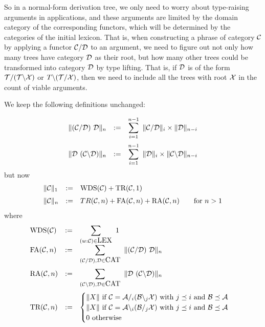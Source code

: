 \documentclass[10pt]{article}
\begin{document}
So in a normal-form derivation tree, we only need to worry about type-raising arguments in applications, and these arguments are limited by the domain category of the corresponding functors, which will be determined by the categories of the initial lexicon.  That is, when constructing a phrase of category ${\cal C}$ by applying a functor ${\cal C}/{\cal D}$ to an argument, we need to figure out not only how many trees have category ${\cal D}$ as their root, but how many other trees could be transformed into category \({\cal D}\) by type lifting. That is,
if \({\cal D}\) is of the form \({\cal T} / ({\cal T} \backslash {\cal X})\) or \(T \backslash ({\cal T} / {\cal X})\), then we need to include
all the trees with root ${\cal X}$ in the count of viable arguments.


\newcommand{\FA}{\mbox{FA}}
\newcommand{\RA}{\mbox{RA}}
\newcommand{\TR}{\mbox{TR}}
\newcommand{\BX}{\mbox{BX}}
\newcommand{\WDS}{\mbox{WDS}}

We keep the following definitions unchanged:

\[
    \begin{array}{lcl}
    \|(\C/\D)\ \D\|_n &:=& \displaystyle\sum_{i=1}^{n-1}\ \|\C/\D\|_i\times\|\D\|_{n-i}\\
    \noalign{\medskip}
    \|\D\ (\C\backslash \D)\|_n &:=& \displaystyle\sum_{i=1}^{n-1}\ \|\D\|_i\times\|\C\backslash \D\|_{n-i}

\end{array}
\]
but now
\[
    \begin{array}{lcl}
    \|\C\|_1 &:=& \WDS(\C) + \TR(\C, 1)\\
    \noalign{\medskip}
    \|\C\|_n &:=& TR(\C, n) + \FA(\C,n) + \RA(\C,n) \qquad\mbox{for $n>1$}
    \end{array}
\]
where
\[
    \begin{array}{lcl}
    \WDS(\C) &:=& \displaystyle \sum_{(w{:}\C)\in \LEX}\  1\\
    \FA(\C,n) &:=& \displaystyle\sum_{(\C/\D),\D\in\CAT}\  \|(\C/\D)\ \D\|_n\\
    \noalign{\medskip}
    \RA(\C,n) &:=& \displaystyle\sum_{(\C\backslash\D),\D\in\CAT}\ \| \D\ (\C\backslash \D)\|_n\\
    \noalign{\medskip}
    \TR(\C,n) &:=& \begin{cases}
                        \|X\| \mbox{\ if\ }\C = \A /_i (\B \backslash_j \X) \mbox{\ with\ } j \preceq i \mbox{\ and\ } \B \preceq \A\\
                        \|X\| \mbox{\ if\ }\C = \A \backslash_i (\B /_j \X) \mbox{\ with\ } j \preceq i \mbox{\ and\ } \B \preceq \A\\
                        0\mbox{\ otherwise}\\
    \end{cases}
    \end{array}
\]
\end{document}
